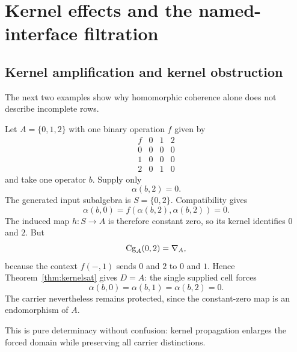 \section{Kernel effects and the named-interface filtration}\label{sec:examples}

\subsection{Kernel amplification and kernel obstruction}

The next two examples show why homomorphic coherence alone does not describe incomplete rows.

\begin{example}\label{ex:amplification}
Let $A=\{0,1,2\}$ with one binary operation $f$ given by
\[
\begin{array}{c|ccc}
f&0&1&2\\\hline
0&0&0&0\\
1&0&0&0\\
2&0&1&0
\end{array}
\]
and take one operator $b$.  Supply only
\[
\alpha(b,2)=0.
\]
The generated input subalgebra is $S=\{0,2\}$.  Compatibility gives
\[
\alpha(b,0)=f(\alpha(b,2),\alpha(b,2))=0.
\]
The induced map $h:S\to A$ is therefore constant zero, so its kernel identifies $0$ and $2$.  But
\[
\operatorname{Cg}_A(0,2)=\nabla_A,
\]
because the context $f(-,1)$ sends $0$ and $2$ to $0$ and $1$.  Hence Theorem~\ref{thm:kernelsat} gives $D=A$: the single supplied cell forces
\[
\alpha(b,0)=\alpha(b,1)=\alpha(b,2)=0.
\]
The carrier nevertheless remains protected, since the constant-zero map is an endomorphism of $A$.
\end{example}

This is pure determinacy without confusion: kernel propagation enlarges the forced domain while preserving all carrier distinctions.

